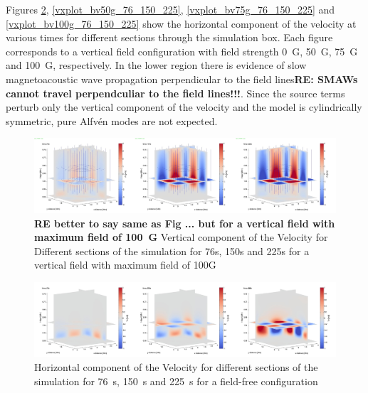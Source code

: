 \documentclass{aastex62}
\begin{document}
Figures \ref{vxplot_bv0g_76_150_225}, \ref{vxplot_bv50g_76_150_225}, \ref{vxplot_bv75g_76_150_225} and \ref{vxplot_bv100g_76_150_225} show the horizontal component of the velocity at various times for different sections through the simulation box. Each figure corresponds to a vertical field configuration with field strength 0~G, 50~G, 75~G and 100~G, respectively. In the lower region there is evidence of slow magnetoacoustic wave propagation perpendicular to the field lines{\bf RE: SMAWs cannot travel perpendculiar to the field lines!!!}. Since the source terms perturb only the vertical component of the velocity and the model is cylindrically symmetric, pure Alfv\'en modes are not expected. 




\begin{figure}[h]\label{vzplot_bv100g_76_150_225}
\includegraphics[scale=0.15]{imrescale/vz_bv100g_76_150_225.jpg}
\caption{{\bf RE better to say same as Fig ... but for a vertical field with maximum field of 100~G} Vertical component of the Velocity for Different sections of the simulation for 76s, 150s and 225s for a vertical field with maximum field of 100G}
\end{figure}

\begin{figure}[h]\label{vxplot_bv0g_76_150_225}
\includegraphics[scale=0.15]{imrescale/vx_bv0g_76_150_225.jpg}
\caption{Horizontal component of the Velocity for different sections of the simulation for 76~s, 150~s and 225~s for a field-free configuration}
\end{figure}
\end{document}
